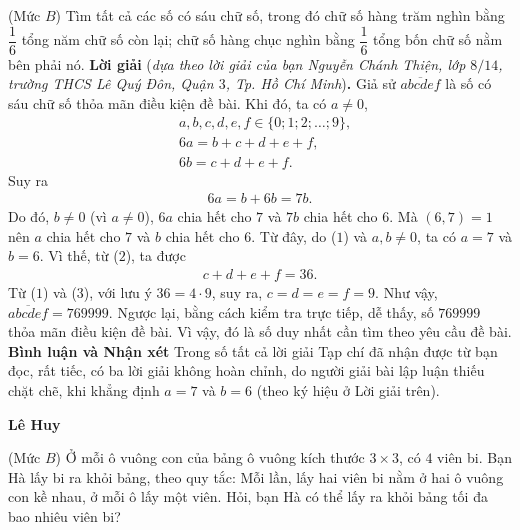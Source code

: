\begin{multicols}{2}
	\setlength{\abovedisplayskip}{4pt}
	\setlength{\belowdisplayskip}{4pt}
	{}
	(Mức $B$) Tìm tất cả các số có sáu chữ số, trong đó chữ số hàng trăm nghìn bằng $\dfrac16$ tổng năm chữ số còn lại; chữ số hàng chục nghìn bằng $\dfrac16$  tổng bốn chữ số nằm bên phải nó.
	\vskip 0.05cm
	\textbf{\color{thachthuctoanhoc}Lời giải} (\textit{dựa theo lời giải của bạn Nguyễn Chánh Thiện, lớp $8/14$, trường THCS Lê Quý Đôn, Quận $3$, Tp. Hồ Chí Minh})\textbf{\color{thachthuctoanhoc}.}
	\vskip 0.05cm
	Giả sử $\overline{abcdef}$  là số có sáu chữ số thỏa mãn điều kiện đề bài. Khi đó, ta có $a \ne 0$,
	\begin{align*}		
		&a, b, c, d, e, f \in \{0; 1; 2; \ldots;9\}, \tag{$1$}\\
		&6a = b + c + d + e + f,\\
		&6b = c + d + e + f.\tag{$2$}
	\end{align*}  
	Suy ra
	\begin{align*}
		6a = b + 6b = 7b.
	\end{align*}
	Do đó, $b \ne 0$ (vì $a \ne 0$), $6a$ chia hết cho $7$ và $7b$ chia hết cho $6$. Mà $(6, 7) = 1$ nên $a$ chia hết cho $7$ và $b$ chia hết cho $6$. Từ đây, do ($1$) và $a, b \ne 0$, ta có $a = 7$ và $b = 6$. Vì thế, từ ($2$), ta được
	\begin{align*}
		c + d + e + f = 36.\tag{$3$}
	\end{align*}
	Từ ($1$) và ($3$), với lưu ý $36 = 4 \cdot 9$, suy ra, $c = d = e = f = 9$.
	\vskip 0.05cm
	Như vậy, $\overline {abcdef}  = 769999$.
	\vskip 0.05cm
	Ngược lại, bằng cách kiểm tra trực tiếp, dễ thấy, số $769999$ thỏa mãn điều kiện đề bài. Vì vậy, đó là số duy nhất cần tìm theo yêu cầu đề bài.
	\vskip 0.05cm
	\textbf{\color{thachthuctoanhoc}Bình luận và Nhận xét}
	\vskip 0.05cm	
	Trong số tất cả lời giải Tạp chí đã nhận được từ bạn đọc, rất tiếc, có ba lời giải không hoàn chỉnh, do người giải bài lập luận thiếu chặt chẽ, khi khẳng định $a = 7$ và $b = 6$ (theo ký hiệu ở Lời giải trên). 
	\begin{flushright}
		\textbf{\color{thachthuctoanhoc}Lê Huy}
	\end{flushright}
	{}
	(Mức $B$)  Ở mỗi ô vuông con của bảng ô vuông kích thước $3\times3$, có $4$ viên bi. Bạn Hà lấy bi ra khỏi bảng, theo quy tắc: Mỗi lần, lấy hai viên bi nằm ở hai ô vuông con kề nhau, ở mỗi ô lấy một viên. Hỏi, bạn Hà có thể lấy ra khỏi bảng tối đa bao nhiêu viên bi?

\end{multicols}

